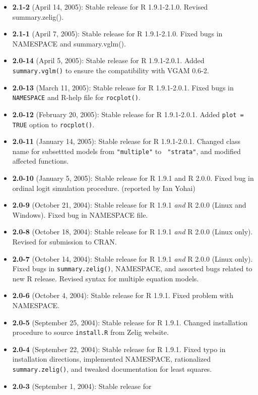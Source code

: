 \documentclass[oneside,letterpaper,12pt]{book}
\begin{document}
\begin{itemize}
\item \textbf{2.1-2} (April 14, 2005):  Stable release for R 1.9.1-2.1.0.  
Revised summary.zelig(). 
\item \textbf{2.1-1} (April 7, 2005):  Stable release for R 1.9.1-2.1.0.  
Fixed bugs in 
  NAMESPACE and summary.vglm().
\item \textbf{2.0-14} (April 5, 2005): Stable release for R
  1.9.1-2.0.1. Added {\tt summary.vglm()} to ensure the compatibility with VGAM 0.6-2.
\item \textbf{2.0-13} (March 11, 2005): Stable release for R 1.9.1-2.0.1.  
Fixed bugs in {\tt NAMESPACE} and R-help file for {\tt rocplot()}.  
\item \textbf{2.0-12} (February 20, 2005): Stable release for R 
1.9.1-2.0.1.  Added {\tt plot = TRUE} option to {\tt rocplot()}.  
\item \textbf{2.0-11} (January 14, 2005): Stable release for R 1.9.1-2.0.1.  
Changed class name for subsettted models from {\tt "multiple"} to {\tt 
"strata"}, and modified affected functions.  
\item \textbf{2.0-10} (January 5, 2005): Stable release for R 1.9.1 and R 
2.0.0.  Fixed bug in ordinal logit simulation procedure.  (reported by Ian 
Yohai)
\item \textbf{2.0-9} (October 21, 2004): Stable release for R 1.9.1 
\emph{and} R 2.0.0 (Linux and Windows).  Fixed bug in NAMESPACE file.  
\item \textbf{2.0-8} (October 18, 2004): Stable release for R 1.9.1 
\emph{and} R 2.0.0 (Linux only).  Revised for submission to CRAN.  
\item \textbf{2.0-7} (October 14, 2004): Stable release for R 1.9.1 \emph{and} R 2.0.0 (Linux 
only).  Fixed bugs in {\tt summary.zelig()},  NAMESPACE, and assorted bugs related to new R 
release.  Revised syntax for multiple equation models.  
\item \textbf{2.0-6} (October 4, 2004): Stable release for R 1.9.1.
Fixed problem with NAMESPACE.  
\item \textbf{2.0-5} (September 25, 2004): Stable release for R 1.9.1.  
Changed installation procedure to source {\tt install.R} from Zelig 
website.
\item \textbf{2.0-4} (September 22, 2004): Stable release for R 1.9.1.  Fixed 
typo in installation directions, implemented NAMESPACE, rationalized {\tt 
summary.zelig()}, and tweaked documentation for least squares.  
\item \textbf{2.0-3} (September 1, 2004): Stable release for 

\end{itemize}
\end{document}
